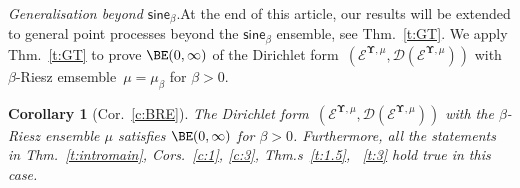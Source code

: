 \documentclass[11pt,letterpaper]{amsart}
\newcommand{\T}{\tau} %
\newcommand{\dom}[1]{\mathcal D(#1)}
\newcommand{\R}{{\mathbb R}}
\newcommand{\purple}[1]{{\color{purple}#1}}
\newcommand{\QP}{{\mu}}
\newcommand{\dUpsilon}{{\mathbf \Upsilon}}
\newcommand{\U}{\dUpsilon}
\newcommand{\sine}{\mathsf{sine}}
\newcommand{\E}{\mathcal E}
\renewcommand{\1}{\mathbf 1}
\renewcommand{\msE}{\mathscr K}
\numberwithin{equation}{section}
\theoremstyle{plain}
\newtheorem{cor}[thm]{Corollary}%
\theoremstyle{definition}
\theoremstyle{remark}
\renewcommand{\paragraph}[1]{\medskip\emph{#1}.\quad}
\begin{document}
\paragraph{Generalisation beyond $\sine_\beta$}At the end of this article, our results will be extended to general point processes beyond the $\sine_\beta$ ensemble, see Thm.~\ref{t:GT}. We apply Thm.~\ref{t:GT} to prove $\BE(0,\infty)$ of the Dirichlet form~$(\E^{\U, \QP}, \dom{\E^{\U, \QP}})$ with $\beta$-Riesz emsemble~$\QP=\QP_\beta$ for $\beta>0$. %
\begin{cor}[Cor.~\ref{c:BRE}]
The Dirichlet form~$(\E^{\U, \QP}, \dom{\E^{\U, \QP}})$ with the $\beta$-Riesz ensemble $\QP$ satisfies $\BE(0,\infty)$ for $\beta>0$. Furthermore, all the statements in Thm.~\ref{t:intromain}, Cors.~\ref{c:1}, \ref{c:3}, Thm.s~\ref{t:1.5}, ~\ref{t:3} hold true in this case. 
\end{cor}

\end{document}
